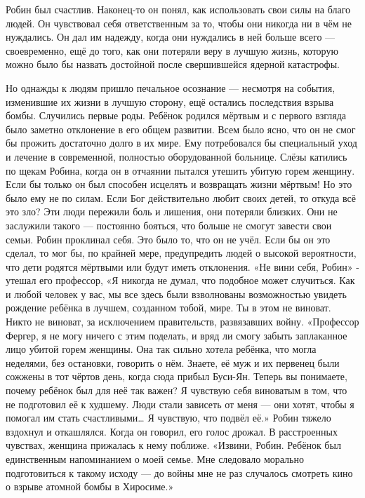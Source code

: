 \documentclass[a4paper,12pt]{book}
\begin{document}
	Робин был счастлив. Наконец-то он понял, как использовать свои силы на благо людей. Он чувствовал себя ответственным за то, чтобы они никогда ни в чём не нуждались. Он дал им надежду, когда они нуждались в ней больше всего — своевременно, ещё до того, как они потеряли веру в лучшую жизнь, которую можно было бы назвать достойной после свершившейся ядерной катастрофы.

	Но однажды к людям пришло печальное осознание — несмотря на события, изменившие их жизни в лучшую сторону, ещё остались последствия взрыва бомбы.
	Случились первые роды. Ребёнок родился мёртвым и с первого взгляда было заметно отклонение в его общем развитии. Всем было ясно, что он не смог бы прожить достаточно долго в их мире. Ему потребовался бы специальный уход и лечение в современной, полностью оборудованной больнице.
	Слёзы катились по щекам Робина, когда он в отчаянии пытался утешить убитую горем женщину. Если бы только он был способен исцелять и возвращать жизни мёртвым! Но это было ему не по силам. Если Бог действительно любит своих детей, то откуда всё это зло? Эти люди пережили боль и лишения, они потеряли близких. Они не заслужили такого — постоянно бояться, что больше не смогут завести свои семьи.
	Робин проклинал себя. Это было то, что он не учёл. Если бы он это сделал, то мог бы, по крайней мере, предупредить людей о высокой вероятности, что дети родятся мёртвыми или будут иметь отклонения. 
	«Не вини себя, Робин» - утешал его профессор,
	«Я никогда не думал, что подобное может случиться. Как и любой человек у вас, мы все здесь были взволнованы возможностью увидеть рождение ребёнка в лучшем, созданном тобой, мире. Ты в этом не виноват. Никто не виноват, за исключением правительств, развязавших войну.
	«Профессор Фергер, я не могу ничего с этим поделать, и вряд ли смогу забыть заплаканное лицо убитой горем женщины. Она так сильно хотела ребёнка, что могла неделями, без остановки, говорить о нём. Знаете, её муж и их первенец были сожжены в тот чёртов день, когда сюда прибыл Буси-Ян. Теперь вы понимаете, почему ребёнок был для неё так важен? Я чувствую себя виноватым в том, что не подготовил её к худшему. Люди стали зависеть от меня — они хотят, чтобы я помогал им стать счастливыми… Я чувствую, что подвёл её.»
	Робин тяжело вздохнул и откашлялся. Когда он говорил, его голос дрожал.
	В расстроенных чувствах, женщина прижалась к нему поближе.
	«Извини, Робин. Ребёнок был единственным напоминанием о моей семье. Мне следовало морально подготовиться к такому исходу — до войны мне не раз случалось смотреть кино о взрыве атомной бомбы в Хиросиме.»
\end{document}
